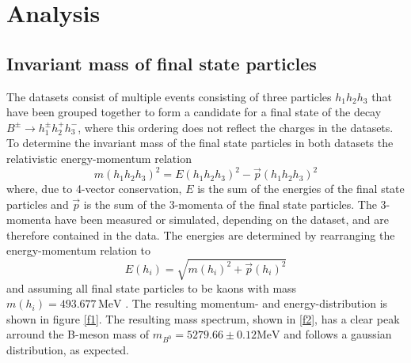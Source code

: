 \section{Analysis}\label{sec:analysis}

\subsection{Invariant mass of final state particles}
The datasets consist of multiple events consisting of three particles $h_1 h_2 h_3$ that have been grouped together to form a candidate for a final state 
of the decay $B^\pm \rightarrow h_1^\pm h_2^+ h_3^-$, where this ordering does not reflect the charges in the datasets. 
To determine the invariant mass of the final state particles in both datasets the relativistic energy-momentum relation 
\begin{equation}
  m(h_1 h_2 h_3)^2 = E(h_1 h_2 h_3)^2 - \vec{p}(h_1 h_2 h_3)^2
\end{equation}
where, due to 4-vector conservation, $E$ is the sum of the energies of the final state particles and $\vec{p}$ is the sum of the 3-momenta of the 
final state particles. The 3-momenta have been measured or simulated, depending on the dataset, and are therefore contained in the data. 
The energies are determined by rearranging the energy-momentum relation to 
\begin{equation}
  E(h_i) = \sqrt{m(h_i)^2 + \vec{p}(h_i)^2}
\end{equation}
and assuming all final state particles to be kaons with mass $m(h_i) = 493.677 \, \si{\mega\eV}$ \cite{pdg}. The resulting momentum- and energy-distribution 
is shown in figure \ref{f1}. The resulting mass spectrum, shown in \ref{f2}, has a clear peak arround the B-meson mass of 
$m_{B^0} = 5279.66 \pm 0.12 \si{\mega\eV}$ \cite{pdg} and follows a gaussian distribution, as expected. 


